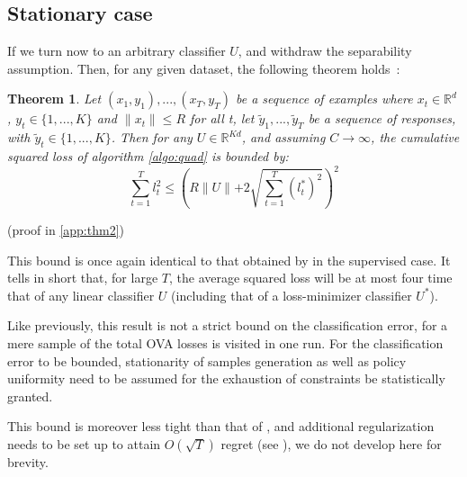 \documentclass[preprint,12pt,authoryear]{elsarticle}
\newtheorem{theorem}{Theorem}
\begin{document}
\subsection{Stationary case}
If we turn now to an arbitrary classifier $U$, and withdraw the separability assumption. Then, for any given dataset, the following theorem holds~:

\begin{theorem}
	\label{theo:BPAT2}
	Let $(x_1,y_1),...,(x_T,y_T)$ be a sequence of examples where $x_t \in \mathbb{R}^d$, $y_t\in \{1,...,K\}$ and $\parallel x_t \parallel\leqslant R$ for all t, let $\tilde{y}_1,...,\tilde{y}_T$ be a sequence of responses, with $\tilde{y}_t\in \{1,...,K\}$. Then for any  $U \in \mathbb{R}^{K d}$, and assuming $C \rightarrow \infty$, the cumulative squared loss of algorithm \ref{algo:quad} is bounded by:
	\[\sum_{t=1}^{T}l_t^2 \leqslant \left(R\parallel{U}\parallel+2 \sqrt{\sum_{t=1}^{T}(l_t^{\ast})^2}\right)^2 \]
\end{theorem}

(proof in \ref{app:thm2})

This bound is once again identical to that obtained by 
\cite{crammer2006online} in the supervised case. 
It tells in short that, for large $T$, the average squared 
loss will be at most four time that of any linear 
classifier $U$ (including that of a loss-minimizer classifier $U^*$). 

Like previously, this result is not a strict bound on the classification error, for a mere sample of the total OVA losses is visited in one run. For the classification error to be bounded, stationarity of samples generation as well as policy uniformity need to be assumed for the exhaustion of constraints be statistically granted.  

This bound is moreover less tight than that of \cite{freund1997decision}, and  additional regularization needs to be set up to attain $O(\sqrt{T})$ regret (see \cite{crammer2006online}),  
we do not develop here for brevity. 


\end{document}

